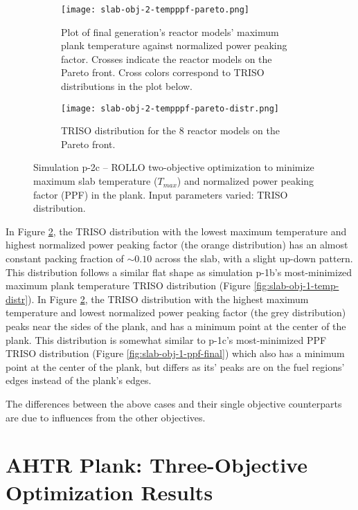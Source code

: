 \begin{figure}[htbp]
    \centering
    \begin{subfigure}{\textwidth}
        \texttt{[image: slab-obj-2-tempppf-pareto.png]}
        \caption{Plot of final generation's reactor models' maximum plank temperature against normalized 
        power peaking factor. Crosses indicate the reactor models on the Pareto front. Cross colors 
        correspond to TRISO distributions in the plot below.}
        \label{fig:slab-obj-2-tempppf-pareto} 
    \end{subfigure}
    \begin{subfigure}{\textwidth}
        \texttt{[image: slab-obj-2-tempppf-pareto-distr.png]}
        \caption{TRISO distribution for the 8 reactor models on the Pareto front.}
        \label{fig:slab-obj-2-tempppf-pareto-distr} 
    \end{subfigure}
    \caption{Simulation p-2c -- ROLLO two-objective optimization to minimize maximum slab temperature 
    ($T_{max}$) and normalized power peaking factor (PPF) in the plank. 
    Input parameters varied: TRISO distribution.}
    \label{fig:slab-obj-2-tempppf}
\end{figure}
In Figure \ref{fig:slab-obj-2-tempppf-pareto-distr}, the TRISO distribution with 
the lowest maximum temperature and highest normalized power peaking factor (the orange 
distribution) has an almost constant packing fraction of $\sim0.10$ across the slab, 
with a slight up-down pattern. 
This distribution follows a similar flat shape as simulation p-1b's most-minimized maximum 
plank temperature TRISO distribution (Figure \ref{fig:slab-obj-1-temp-distr}).
In Figure \ref{fig:slab-obj-2-tempppf-pareto-distr}, the TRISO distribution with 
the highest maximum temperature and lowest normalized power peaking factor (the grey 
distribution) peaks near the sides of the plank, and has a minimum point at the center
of the plank. 
This distribution is somewhat similar to p-1c's most-minimized PPF TRISO distribution 
(Figure \ref{fig:slab-obj-1-ppf-final})
which also has a minimum point at the center of the plank, but differs as its' peaks 
are on the fuel regions' edges instead of the plank's edges. 

The differences between the above cases and their single objective counterparts are due to 
influences from the other objectives. 

\pagebreak
\section{AHTR Plank: Three-Objective Optimization Results}
\label{sec:plank-three-obj}

